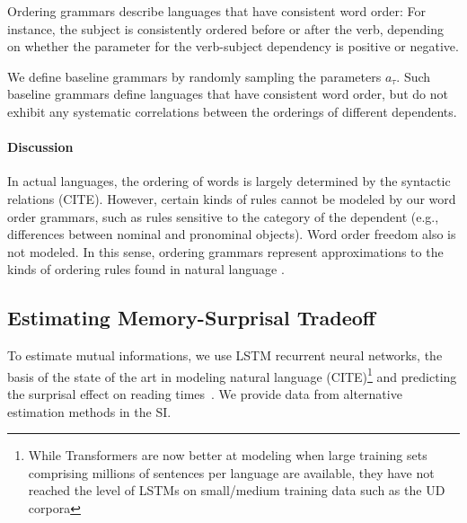 \documentclass[11pt,letterpaper]{article}
\begin{document}
Ordering grammars describe languages that have consistent word order:
For instance, the subject is consistently ordered before or after the verb, depending on whether the parameter for the verb-subject dependency is positive or negative.

We define baseline grammars by randomly sampling the parameters $a_\tau$.
Such baseline grammars define languages that have consistent word order, but do not exhibit any systematic correlations between the orderings of different dependents.



\paragraph{Discussion}
In actual languages, the ordering of words is largely determined by the syntactic relations (CITE).
However, certain kinds of rules cannot be modeled by our word order grammars, such as rules sensitive to the category of the dependent (e.g., differences between nominal and pronominal objects).
Word order freedom also is not modeled.
In this sense, ordering grammars represent approximations to the kinds of ordering rules found in natural language \cite{gildea-optimizing-2007, gildea-grammars-2010, gildea-human-2015}.



\subsection{Estimating Memory-Surprisal Tradeoff}\label{sec:method}
To estimate mutual informations, we use LSTM recurrent neural networks, the basis of the state of the art in modeling natural language (CITE)\footnote{While Transformers are now better at modeling when large training sets comprising millions of sentences per language are available, they have not reached the level of LSTMs on small/medium training data such as the UD corpora} and predicting the surprisal effect on reading times~\citep{frank-insensitivity-2011, goodkind-predictive-2018}.
We provide data from alternative estimation methods in the SI.


\end{document}
